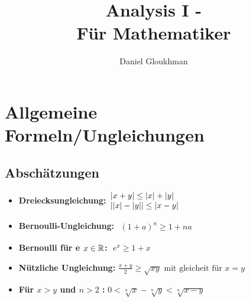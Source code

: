 \documentclass[german]{latex4ei/latex4ei_sheet}
\title{Analysis I -\\ Für Mathematiker}
\author{Daniel Gloukhman}					%
\begin{document}
\maketitle   %


\section{Allgemeine Formeln/Ungleichungen}

\begin{sectionbox}
	\subsection{Abschätzungen}
	\begin{itemize}
		\item \textbf{Dreiecksungleichung:}\begin{math}\begin{array}{l}
	\left\vert x + y\right\vert \le \left\vert x\right\vert + \left\vert y\right\vert \\
	\left\vert\left\vert x\right\vert- \left\vert y\right\vert\right\vert \le \left\vert x-y\right\vert
\end{array}\end{math}

   		\item \textbf{Bernoulli-Ungleichung:} \begin{math}\begin{array}{l}
	(1+a)^n \ge 1 + na
\end{array}\end{math}

		\item \textbf{Bernoulli für e  $x \in \operatorname{\mathbb R}$:}\qquad $\text{  }e^x  \ge 1+x $
		\item \textbf{Nützliche Ungleichung: }$\frac{x+y}{2}\ge\sqrt{xy}\text{ mit gleicheit für }x=y$
		\item \textbf{Für $x>y$ und $n>2$ : }$0<\sqrt[n]{x}-\sqrt[n]{y}<\sqrt[n]{x-y}$

	\end{itemize}

\end{sectionbox}
\end{document}
